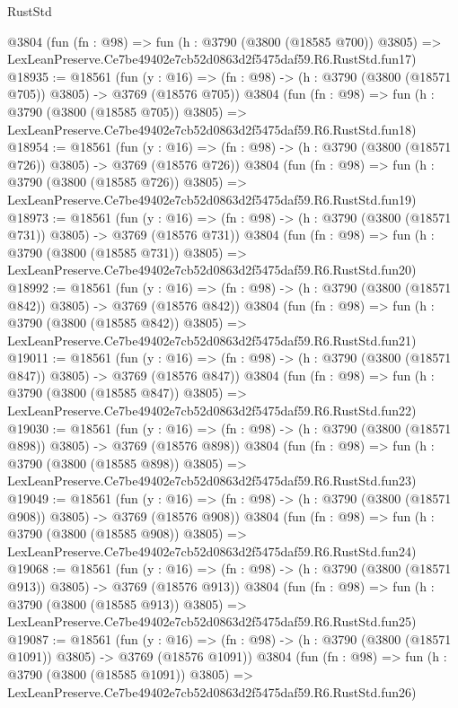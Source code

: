 \begin{lexlean}{RustStd}
\begin{coremodule}
    @3804
    (fun (fn : @98) =>
    fun (h : @3790 (@3800 (@18585 @700)) @3805) =>
    LexLeanPreserve.Ce7be49402e7cb52d0863d2f5475daf59.R6.RustStd.fun17)
@18935 := @18561
    (fun (y : @16) => (fn : @98) -> (h : @3790 (@3800 (@18571 @705)) @3805) -> @3769 (@18576 @705))
    @3804
    (fun (fn : @98) =>
    fun (h : @3790 (@3800 (@18585 @705)) @3805) =>
    LexLeanPreserve.Ce7be49402e7cb52d0863d2f5475daf59.R6.RustStd.fun18)
@18954 := @18561
    (fun (y : @16) => (fn : @98) -> (h : @3790 (@3800 (@18571 @726)) @3805) -> @3769 (@18576 @726))
    @3804
    (fun (fn : @98) =>
    fun (h : @3790 (@3800 (@18585 @726)) @3805) =>
    LexLeanPreserve.Ce7be49402e7cb52d0863d2f5475daf59.R6.RustStd.fun19)
@18973 := @18561
    (fun (y : @16) => (fn : @98) -> (h : @3790 (@3800 (@18571 @731)) @3805) -> @3769 (@18576 @731))
    @3804
    (fun (fn : @98) =>
    fun (h : @3790 (@3800 (@18585 @731)) @3805) =>
    LexLeanPreserve.Ce7be49402e7cb52d0863d2f5475daf59.R6.RustStd.fun20)
@18992 := @18561
    (fun (y : @16) => (fn : @98) -> (h : @3790 (@3800 (@18571 @842)) @3805) -> @3769 (@18576 @842))
    @3804
    (fun (fn : @98) =>
    fun (h : @3790 (@3800 (@18585 @842)) @3805) =>
    LexLeanPreserve.Ce7be49402e7cb52d0863d2f5475daf59.R6.RustStd.fun21)
@19011 := @18561
    (fun (y : @16) => (fn : @98) -> (h : @3790 (@3800 (@18571 @847)) @3805) -> @3769 (@18576 @847))
    @3804
    (fun (fn : @98) =>
    fun (h : @3790 (@3800 (@18585 @847)) @3805) =>
    LexLeanPreserve.Ce7be49402e7cb52d0863d2f5475daf59.R6.RustStd.fun22)
@19030 := @18561
    (fun (y : @16) => (fn : @98) -> (h : @3790 (@3800 (@18571 @898)) @3805) -> @3769 (@18576 @898))
    @3804
    (fun (fn : @98) =>
    fun (h : @3790 (@3800 (@18585 @898)) @3805) =>
    LexLeanPreserve.Ce7be49402e7cb52d0863d2f5475daf59.R6.RustStd.fun23)
@19049 := @18561
    (fun (y : @16) => (fn : @98) -> (h : @3790 (@3800 (@18571 @908)) @3805) -> @3769 (@18576 @908))
    @3804
    (fun (fn : @98) =>
    fun (h : @3790 (@3800 (@18585 @908)) @3805) =>
    LexLeanPreserve.Ce7be49402e7cb52d0863d2f5475daf59.R6.RustStd.fun24)
@19068 := @18561
    (fun (y : @16) => (fn : @98) -> (h : @3790 (@3800 (@18571 @913)) @3805) -> @3769 (@18576 @913))
    @3804
    (fun (fn : @98) =>
    fun (h : @3790 (@3800 (@18585 @913)) @3805) =>
    LexLeanPreserve.Ce7be49402e7cb52d0863d2f5475daf59.R6.RustStd.fun25)
@19087 := @18561
    (fun (y : @16) =>
    (fn : @98) -> (h : @3790 (@3800 (@18571 @1091)) @3805) -> @3769 (@18576 @1091))
    @3804
    (fun (fn : @98) =>
    fun (h : @3790 (@3800 (@18585 @1091)) @3805) =>
    LexLeanPreserve.Ce7be49402e7cb52d0863d2f5475daf59.R6.RustStd.fun26)

\end{coremodule}
\end{lexlean}
